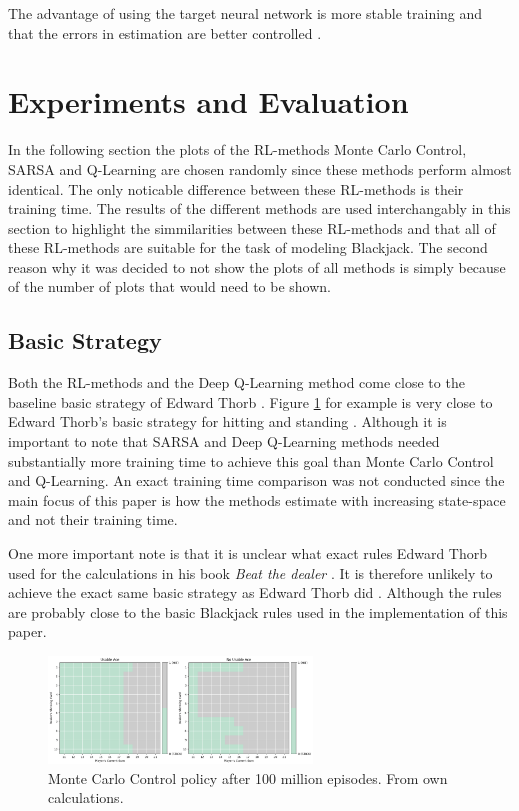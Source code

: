 \documentclass[conference]{IEEEtran}
\begin{document}
The advantage of using the target neural network is more stable training and that the errors in estimation are better controlled \cite{b6}.



\section{Experiments and Evaluation}
In the following section the plots of the RL-methods Monte Carlo Control, SARSA and Q-Learning are chosen randomly since these methods perform almost identical. 
The only noticable difference between these RL-methods is their training time.  
The results of the different methods are used interchangably in this section to highlight the simmilarities between these RL-methods and that all of these RL-methods are suitable for the task of modeling Blackjack. 
The second reason why it was decided to not show the plots of all methods is simply because of the number of plots that would need to be shown. 

\subsection{Basic Strategy}
Both the RL-methods and the Deep Q-Learning method come close to the baseline basic strategy of Edward Thorb \cite{b1}.
Figure \ref{fig:monte-carlo-basic-strategy} for example is very close to Edward Thorb's basic strategy for hitting and standing \cite{b1}. 
Although it is important to note that SARSA and Deep Q-Learning  methods needed substantially more training time to achieve this goal than Monte Carlo Control and Q-Learning. 
An exact training time comparison was not conducted since the main focus of this paper is how the methods estimate with increasing state-space and not their training time.

One more important note is that it is unclear what exact rules Edward Thorb used for the calculations in his book \textit{Beat the dealer} \cite{b1}. 
It is therefore unlikely to achieve the exact same basic strategy as Edward Thorb did \cite{b1}.
Although the rules are probably close to the basic Blackjack rules used in the implementation of this paper. 

\begin{figure}
	\centering
	\includegraphics[width=70mm]{figures/MC/basic-100-million/policy.png}
	\caption{Monte Carlo Control policy after 100 million episodes. From own calculations.}
	\label{fig:monte-carlo-basic-strategy}
\end{figure}
\end{document}

